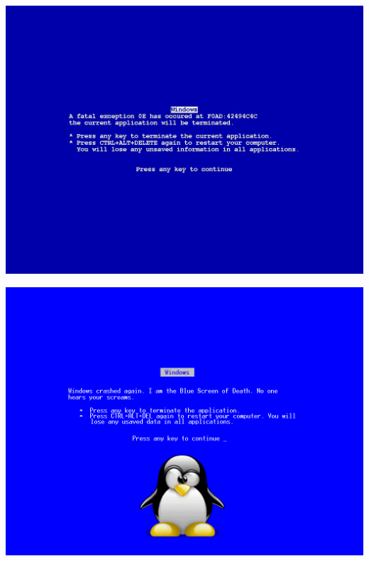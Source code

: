 \documentclass{beamer}
\begin{document}
\begin{frame}
  \begin{center}
    \includegraphics[scale=0.30]{images/fix-bsod-win7.jpg}
  \end{center}
\end{frame}


\begin{frame}
  \begin{center}
    \includegraphics[scale=1.2]{images/hb7nfO.png}
  \end{center}
\end{frame}
\end{document}
